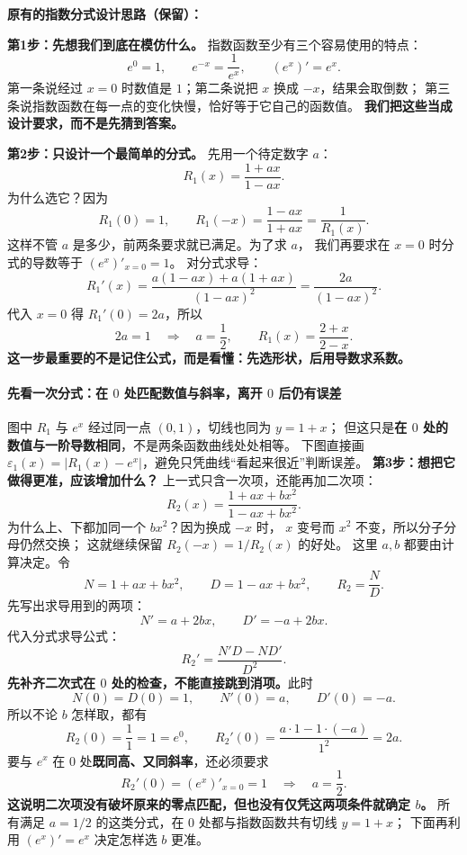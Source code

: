 \begin{proofbox}
\noindent\textbf{原有的指数分式设计思路（保留）：}

\textbf{第1步：先想我们到底在模仿什么。}
指数函数至少有三个容易使用的特点：
\[
 e^0=1,\qquad e^{-x}=\frac1{e^x},\qquad (e^x)'=e^x.
\]
第一条说经过 $x=0$ 时数值是 $1$；第二条说把 $x$ 换成 $-x$，结果会取倒数；
第三条说指数函数在每一点的变化快慢，恰好等于它自己的函数值。
\textbf{我们把这些当成设计要求，而不是先猜到答案。}

\textbf{第2步：只设计一个最简单的分式。}
先用一个待定数字 $a$：
\[
 R_1(x)=\frac{1+ax}{1-ax}.
\]
为什么选它？因为
\[
 R_1(0)=1,\qquad R_1(-x)=\frac{1-ax}{1+ax}=\frac1{R_1(x)}.
\]
这样不管 $a$ 是多少，前两条要求就已满足。为了求 $a$，
我们再要求在 $x=0$ 时分式的导数等于 $(e^x)'_{x=0}=1$。
对分式求导：
\[
 R_1'(x)=\frac{a(1-ax)+a(1+ax)}{(1-ax)^2}
 =\frac{2a}{(1-ax)^2}.
\]
代入 $x=0$ 得 $R_1'(0)=2a$，所以
\[
 2a=1\quad\Longrightarrow\quad a=\frac12,
 \qquad \boxed{R_1(x)=\frac{2+x}{2-x}}.
\]
\textbf{这一步最重要的不是记住公式，而是看懂：先选形状，后用导数求系数。}

\newpage
\paragraph{先看一次分式：在 $0$ 处匹配数值与斜率，离开 $0$ 后仍有误差}\mbox{}\par
\begin{center}\end{center}
图中 $R_1$ 与 $e^x$ 经过同一点 $(0,1)$，切线也同为 $y=1+x$；
但这只是\textbf{在 $0$ 处的数值与一阶导数相同}，不是两条函数曲线处处相等。
下图直接画 $\varepsilon_1(x)=|R_1(x)-e^x|$，避免只凭曲线“看起来很近”判断误差。
\newpage
\textbf{第3步：想把它做得更准，应该增加什么？}
上一式只含一次项，还能再加二次项：
\[
 R_2(x)=\frac{1+ax+bx^2}{1-ax+bx^2}.
\]
为什么上、下都加同一个 $bx^2$？因为换成 $-x$ 时，
$x$ 变号而 $x^2$ 不变，所以分子分母仍然交换；
这就继续保留 $R_2(-x)=1/R_2(x)$ 的好处。
这里 $a,b$ 都要由计算决定。令
\[
 N=1+ax+bx^2,\qquad D=1-ax+bx^2,\qquad R_2=\frac ND.
\]
先写出求导用到的两项：
\[
 N'=a+2bx,\qquad D'=-a+2bx.
\]
代入分式求导公式：
\[
 R_2'=\frac{N'D-ND'}{D^2}.
\]
\textbf{先补齐二次式在 $0$ 处的检查，不能直接跳到消项。}此时
\[
 N(0)=D(0)=1,\qquad N'(0)=a,\qquad D'(0)=-a.
\]
所以不论 $b$ 怎样取，都有
\[
 R_2(0)=\frac11=1=e^0,
 \qquad R_2'(0)=\frac{a\cdot1-1\cdot(-a)}{1^2}=2a.
\]
要与 $e^x$ 在 $0$ 处\textbf{既同高、又同斜率}，还必须要求
\[
 R_2'(0)=(e^x)'_{x=0}=1
 \quad\Longrightarrow\quad a=\frac12.
\]
\textbf{这说明二次项没有破坏原来的零点匹配，但也没有仅凭这两项条件就确定 $b$。}
所有满足 $a=1/2$ 的这类分式，在 $0$ 处都与指数函数共有切线 $y=1+x$；
下面再利用 $(e^x)'=e^x$ 决定怎样选 $b$ 更准。


\end{proofbox}
